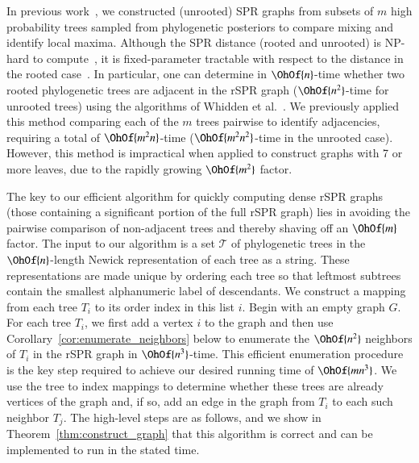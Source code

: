 \documentclass[]{elsarticle}
\begin{document}
In previous work~\citep{Whidden2015-yi}, we constructed (unrooted) SPR graphs from subsets of $m$ high probability trees sampled from phylogenetic posteriors to compare mixing and identify local maxima.
Although the SPR distance (rooted and unrooted) is NP-hard to compute~\citep{bordewich05,hickey2008sdc}, it is fixed-parameter tractable with respect to the distance in the rooted case~\citep{bordewich05}.
In particular, one can determine in $\OhOf{n}$-time whether two rooted phylogenetic trees are adjacent in the rSPR graph ($\OhOf{n^2}$-time for unrooted trees) using the algorithms of Whidden et al.~\citep{whidden2009unifying,whidden2010fast, whidden2013hybridization,Whidden2015-yi}.
We previously applied this method comparing each of the $m$ trees pairwise to identify adjacencies, requiring a total of $\OhOf{m^2n}$-time ($\OhOf{m^2 n^2}$-time in the unrooted case).
However, this method is impractical when applied to construct graphs with 7 or more leaves, due to the rapidly growing $\OhOf{m^2}$ factor.

The key to our efficient algorithm for quickly computing dense rSPR graphs (those containing a significant portion of the full rSPR graph) lies in avoiding the pairwise comparison of non-adjacent trees and thereby shaving off an $\OhOf{m}$ factor.
The input to our algorithm is a set $\mathcal{T}$ of phylogenetic trees in the $\OhOf{n}$-length Newick \citep{felsenstein1990newick} representation of each tree as a string.
These representations are made unique by ordering each tree so that leftmost subtrees contain the smallest alphanumeric label of descendants.
We construct a mapping from each tree $T_i$ to its order index in this list $i$.
Begin with an empty graph $G$.
For each tree $T_i$, we first add a vertex $i$ to the graph and then use Corollary~\ref{cor:enumerate_neighbors} below to enumerate the $\OhOf{n^2}$ neighbors of $T_i$ in the rSPR graph in $\OhOf{n^3}$-time.
This efficient enumeration procedure is the key step required to achieve our desired running time of $\OhOf{mn^3}$.
We use the tree to index mappings to determine whether these trees are already vertices of the graph and, if so, add an edge in the graph from $T_i$ to each such neighbor $T_j$.
The high-level steps are as follows, and we show in Theorem~\ref{thm:construct_graph} that this algorithm is correct and can be implemented to run in the stated time.
\end{document}
